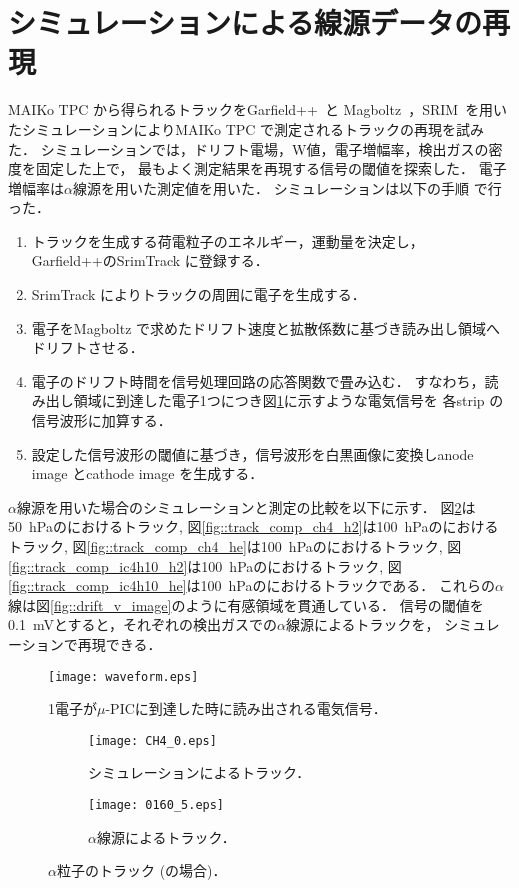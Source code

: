 \documentclass[../master]{subfiles}
\begin{document}
\section{シミュレーションによる線源データの再現}
MAIKo TPC から得られるトラックをGarfield++~\cite{garfield++}と
Magboltz~\cite{magboltz}，SRIM~\cite{SRIM}を用いたシミュレーションによりMAIKo TPC で測定されるトラックの再現を試みた．
シミュレーションでは，ドリフト電場，W値，電子増幅率，検出ガスの密度を固定した上で，
最もよく測定結果を再現する信号の閾値を探索した．
電子増幅率は$\alpha$線源を用いた測定値を用いた．
シミュレーションは以下の手順%
で行った．
\begin{enumerate}
\item\label{sim::particle_generate}
  トラックを生成する荷電粒子のエネルギー，運動量を決定し，
  Garfield++のSrimTrack に登録する．
\item
  SrimTrack によりトラックの周囲に電子を生成する．
\item
  電子をMagboltz で求めたドリフト速度と拡散係数に基づき読み出し領域へドリフトさせる．
\item
  電子のドリフト時間を信号処理回路の応答関数で畳み込む．
  すなわち，読み出し領域に到達した電子1つにつき図\ref{fig::mu-pic_readout}に示すような電気信号を
  各strip の信号波形に加算する．
\item
  設定した信号波形の閾値に基づき，信号波形を白黒画像に変換しanode image とcathode image を生成する．
\end{enumerate}
$\alpha$線源を用いた場合のシミュレーションと測定の比較を以下に示す．
図\ref{fig::track_comp_ch4}は\SI{50}{\hecto\pascal}の\Methane におけるトラック,
図\ref{fig::track_comp_ch4_h2}は\SI{100}{\hecto\pascal}の\MethaneHydro におけるトラック,
図\ref{fig::track_comp_ch4_he}は\SI{100}{\hecto\pascal}の\MethaneHerium におけるトラック, 
図\ref{fig::track_comp_ic4h10_h2}は\SI{100}{\hecto\pascal}の\isoButaneHydro におけるトラック,
図\ref{fig::track_comp_ic4h10_he}は\SI{100}{\hecto\pascal}の\isoButaneHerium におけるトラックである．
これらの$\alpha$線は図\ref{fig::drift_v_image}のように有感領域を貫通している．
信号の閾値を\SI{0.1}{\milli\volt}とすると，それぞれの検出ガスでの$\alpha$線源によるトラックを，
シミュレーションで再現できる．
\begin{figure}
  \centering
  \texttt{[image: waveform.eps]}
  \caption{1電子が$\mu$-PICに到達した時に読み出される電気信号．}
  \label{fig::mu-pic_readout}
\end{figure}

\begin{figure}
  \centering
  \begin{subfigure}{0.48\columnwidth}
    \centering
    \texttt{[image: CH4\_0.eps]}
    \caption{シミュレーションによるトラック．}
  \end{subfigure}
  \begin{subfigure}{0.48\columnwidth}
    \centering
    \texttt{[image: 0160\_5.eps]}
    \caption{$\alpha$線源によるトラック．}
  \end{subfigure}
  \caption{$\alpha$粒子のトラック (\Methane の場合)．}
  \label{fig::track_comp_ch4}
\end{figure}
\end{document}
